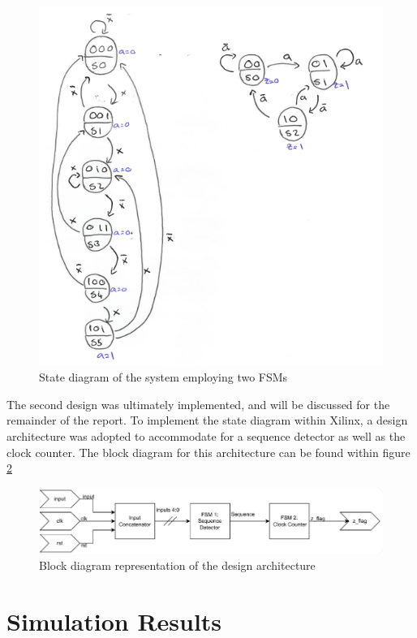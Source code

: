 \documentclass[12pt,a4paper]{article}
\begin{document}
\begin{figure}[H]
    \centering
    \includegraphics[scale=1]{images/double_fsm.png}
    \caption{State diagram of the system employing two FSMs}
    \label{fig:double_fsm}
\end{figure}

The second design was ultimately implemented, and will be discussed for the remainder of the report. To implement the state diagram within Xilinx, a design architecture was adopted to accommodate for a sequence detector as well as the clock counter. The block diagram for this architecture can be found within figure \ref{fig:block_diagram}

\begin{figure}[H]
    \centering
    \includegraphics[scale=0.25]{images/block_diagram.png}
    \caption{Block diagram representation of the design architecture}
    \label{fig:block_diagram}
\end{figure}


\section{Simulation Results}
\end{document}

